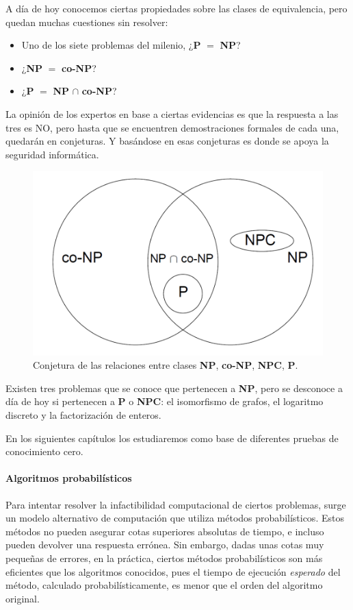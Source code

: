 A día de hoy conocemos ciertas propiedades sobre las clases de equivalencia, pero quedan muchas cuestiones sin resolver:

\begin{itemize}
	\item Uno de los siete problemas del milenio, ¿\textbf{P} $=$ \textbf{NP}?
	\item ¿\textbf{NP} $=$ \textbf{co-NP}?
	\item ¿\textbf{P} $=$ \textbf{NP} $\cap$ \textbf{co-NP}?
\end{itemize}


La opinión de los expertos en base a ciertas evidencias es que la respuesta a las tres es NO, pero hasta que se encuentren demostraciones formales de cada una, quedarán en conjeturas. Y basándose en esas conjeturas es donde se apoya la seguridad informática.


\begin{figure}[bth]
	\begin{center}
		\includegraphics[width=.45\linewidth]{gfx/NPclasses}
	\end{center}
	\caption{Conjetura de las relaciones entre clases \textbf{NP}, \textbf{co-NP}, \textbf{NPC}, \textbf{P}.}
	\label{fig:NPclasses}
\end{figure}


Existen tres problemas que se conoce que pertenecen a \textbf{NP}, pero se desconoce a día de hoy si pertenecen a \textbf{P} o \textbf{NPC}: el isomorfismo de grafos, el logaritmo discreto y la factorización de enteros.

En los siguientes capítulos los estudiaremos como base de diferentes pruebas de conocimiento cero.


\hfil


\paragraph{Algoritmos probabilísticos} Para intentar resolver la infactibilidad computacional de ciertos problemas, surge un modelo alternativo de computación que utiliza métodos probabilísticos. Estos métodos no pueden asegurar cotas superiores absolutas de tiempo, e incluso pueden devolver una respuesta errónea. Sin embargo, dadas unas cotas muy pequeñas de errores, en la práctica, ciertos métodos probabilísticos son más eficientes que los algoritmos conocidos, pues el tiempo de ejecución \textit{esperado} del método, calculado probabilísticamente, es menor que el orden del algoritmo original.


